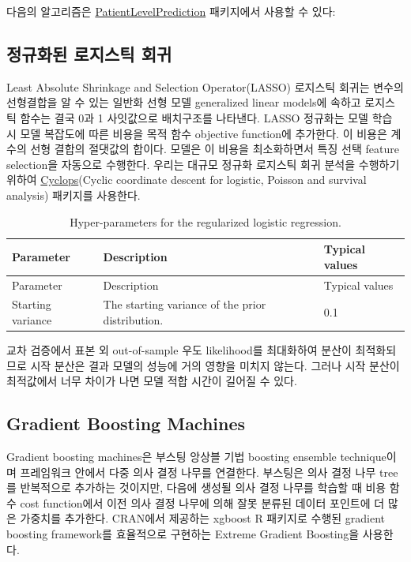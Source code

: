 \documentclass[10.5pt]{book}
\theoremstyle{definition}
\theoremstyle{definition}
\theoremstyle{definition}
\theoremstyle{remark}
\begin{document}
다음의 알고리즘은
\href{https://ohdsi.github.io/PatientLevelPrediction/}{PatientLevelPrediction}
패키지에서 사용할 수 있다:

\subsection{정규화된 로지스틱 회귀}\label{--}

Least Absolute Shrinkage and Selection Operator(LASSO) 로지스틱 회귀는
변수의 선형결합을 알 수 있는 일반화 선형 모델 generalized linear
models에 속하고 로지스틱 함수는 결국 0과 1 사잇값으로 배치구조를
나타낸다. LASSO 정규화는 모델 학습 시 모델 복잡도에 따른 비용을 목적
함수 objective function에 추가한다. 이 비용은 계수의 선형 결합의
절댓값의 합이다. 모델은 이 비용을 최소화하면서 특징 선택 feature
selection을 자동으로 수행한다. 우리는 대규모 정규화 로지스틱 회귀 분석을
수행하기 위하여 \href{https://ohdsi.github.io/Cyclops/}{Cyclops}(Cyclic
coordinate descent for logistic, Poisson and survival analysis) 패키지를
사용한다.  
 

\begin{longtable}[]{@{}lll@{}}
\caption{\label{tab:lassoParameters} Hyper-parameters for the regularized
logistic regression.}\tabularnewline
\toprule
Parameter & Description & Typical values\tabularnewline
\midrule
\endfirsthead
\toprule
Parameter & Description & Typical values\tabularnewline
\midrule
\endhead
Starting variance & The starting variance of the prior distribution. &
0.1\tabularnewline
\bottomrule
\end{longtable}

교차 검증에서 표본 외 out-of-sample 우도 likelihood를 최대화하여 분산이
최적화되므로 시작 분산은 결과 모델의 성능에 거의 영향을 미치지 않는다.
그러나 시작 분산이 최적값에서 너무 차이가 나면 모델 적합 시간이 길어질
수 있다.  

\subsection{Gradient Boosting
Machines}\label{gradient-boosting-machines}

Gradient boosting machines은 부스팅 앙상블 기법 boosting ensemble
technique이며 프레임워크 안에서 다중 의사 결정 나무를 연결한다. 부스팅은
의사 결정 나무 tree를 반복적으로 추가하는 것이지만, 다음에 생성될 의사
결정 나무를 학습할 때 비용 함수 cost function에서 이전 의사 결정 나무에
의해 잘못 분류된 데이터 포인트에 더 많은 가중치를 추가한다. CRAN에서
제공하는 xgboost R 패키지로 수행된 gradient boosting framework를
효율적으로 구현하는 Extreme Gradient Boosting을 사용한다.
 
\end{document}
